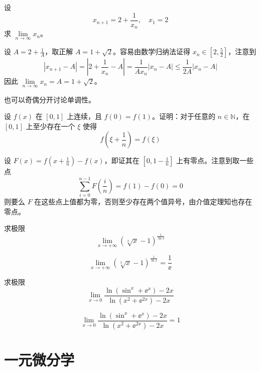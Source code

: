 \begin{problem}[000030]
设
\[ x_{n+1} = 2 + \frac{1}{x_n}, \quad x_1 = 2 \]
求 $\lim\limits_{n \to \infty} x_n$。
\end{problem}

\begin{solution}
	设 $A = 2 + \frac{1}{A}$，取正解 $A = 1 + \sqrt{2}$。容易由数学归纳法证得 $x_n \in [2, \frac{5}{2}]$，注意到
	\[ |x_{n+1} - A| = \left|2 + \frac{1}{x_n} - A\right| = \frac{1}{Ax_n} |x_n - A| \leqslant \frac{1}{2A} |x_n - A| \]
	因此 $\lim\limits_{n \to \infty} x_n = A = 1 + \sqrt{2}$。

	也可以奇偶分开讨论单调性。
\end{solution}

\begin{problem}[000031]
设 $f(x)$ 在 $[0, 1]$ 上连续，且 $f(0) = f(1)$。证明：对于任意的 $n \in \mathbb{N}$，在 $[0, 1]$ 上至少存在一个 $\xi$ 使得
\[ f\left(\xi + \frac{1}{n}\right) = f(\xi) \]
\end{problem}

\begin{solution}
	设 $F(x) = f(x + \frac{1}{n}) - f(x)$，即证其在 $[0, 1 - \frac{1}{n}]$ 上有零点。注意到取一些点
	\[ \sum_{i=0}^{n - 1} F \left(\frac{i}{n}\right) = f(1) - f(0) = 0 \]
	则要么 $F$ 在这些点上值都为零，否则至少存在两个值异号，由介值定理知也存在零点。
\end{solution}

\begin{problem}[000059]
求极限
\[ \lim_{x \to +\infty} \left(\sqrt[x]{x} - 1\right)^{\frac{1}{\ln x}} \]
\end{problem}

\begin{solution}
	\[ \lim_{x \to +\infty} \left(\sqrt[x]{x} - 1\right)^{\frac{1}{\ln x}} = \frac{1}{\ee} \]
\end{solution}

\begin{problem}[000060]
求极限
\[ \lim_{x \to 0} \frac{\ln(\sin^ x + \ee^x) - 2x}{\ln(x^2 + \ee^{2x}) - 2x} \]
\end{problem}

\begin{solution}
	\[ \lim_{x \to 0} \frac{\ln(\sin^ x + \ee^x) - 2x}{\ln(x^2 + \ee^{2x}) - 2x} = 1 \]
\end{solution}

\section{一元微分学}

